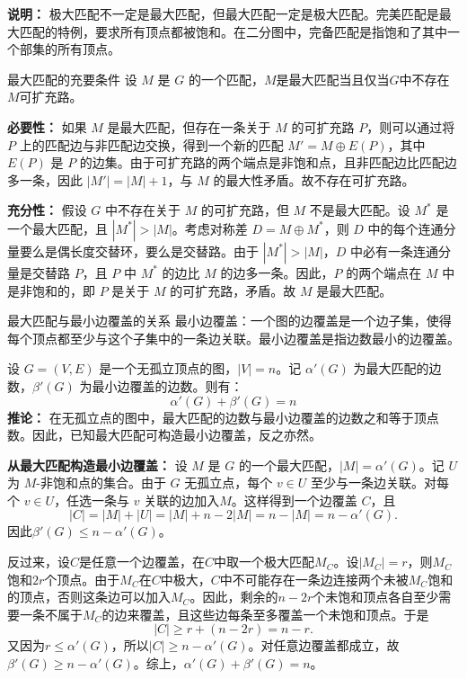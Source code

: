 \documentclass[lang=cn,11pt]{elegantbook}
\begin{document}
\textbf{说明：}
极大匹配不一定是最大匹配，但最大匹配一定是极大匹配。完美匹配是最大匹配的特例，要求所有顶点都被饱和。在二分图中，完备匹配是指饱和了其中一个部集的所有顶点。
\begin{theorem}{最大匹配的充要条件}
    设 $M$ 是 $G$ 的一个匹配，$M$是最大匹配当且仅当$G$中不存在$M$可扩充路。
\end{theorem}
 \textbf{必要性：} 如果 $M$ 是最大匹配，但存在一条关于 $M$ 的可扩充路 $P$，则可以通过将 $P$ 上的匹配边与非匹配边交换，得到一个新的匹配 $M' = M \oplus E(P)$，其中 $E(P)$ 是 $P$ 的边集。由于可扩充路的两个端点是非饱和点，且非匹配边比匹配边多一条，因此 $|M'| = |M| + 1$，与 $M$ 的最大性矛盾。故不存在可扩充路。

\textbf{充分性：} 假设 $G$ 中不存在关于 $M$ 的可扩充路，但 $M$ 不是最大匹配。设 $M^*$ 是一个最大匹配，且 $|M^*| > |M|$。考虑对称差 $D = M \oplus M^*$，则 $D$ 中的每个连通分量要么是偶长度交替环，要么是交替路。由于 $|M^*| > |M|$，$D$ 中必有一条连通分量是交替路 $P$，且 $P$ 中 $M^*$ 的边比 $M$ 的边多一条。因此，$P$ 的两个端点在 $M$ 中是非饱和的，即 $P$ 是关于 $M$ 的可扩充路，矛盾。故 $M$ 是最大匹配。
\begin{theorem}{最大匹配与最小边覆盖的关系}
最小边覆盖：一个图的边覆盖是一个边子集，使得每个顶点都至少与这个子集中的一条边关联。最小边覆盖是指边数最小的边覆盖。

设 $G=(V,E)$ 是一个无孤立顶点的图，$|V|=n$。记 $\alpha'(G)$ 为最大匹配的边数，$\beta'(G)$ 为最小边覆盖的边数。则有：
\[
\alpha'(G) + \beta'(G) = n
\]
\textbf{推论：}
在无孤立点的图中，最大匹配的边数与最小边覆盖的边数之和等于顶点数。因此，已知最大匹配可构造最小边覆盖，反之亦然。
\end{theorem}
\textbf{从最大匹配构造最小边覆盖：}
设 $M$ 是 $G$ 的一个最大匹配，$|M| = \alpha'(G)$。记 $U$ 为 $M$-非饱和点的集合。由于 $G$ 无孤立点，每个 $v \in U$ 至少与一条边关联。对每个 $v \in U$，任选一条与 $v$ 关联的边加入$M$。这样得到一个边覆盖 $C$，且
\[
|C|=|M|+|U|=|M|+n-2|M|=n-|M|=n-\alpha'(G).
\]
因此$\beta'(G)\leqslant n-\alpha'(G)$。

反过来，设$C$是任意一个边覆盖，在$C$中取一个极大匹配$M_C$。设$|M_C|=r$，则$M_C$饱和$2r$个顶点。由于$M_C$在$C$中极大，$C$中不可能存在一条边连接两个未被$M_C$饱和的顶点，否则这条边可以加入$M_C$。因此，剩余的$n-2r$个未饱和顶点各自至少需要一条不属于$M_C$的边来覆盖，且这些边每条至多覆盖一个未饱和顶点。于是
\[
|C|\geqslant r+(n-2r)=n-r.
\]
又因为$r\leqslant \alpha'(G)$，所以$|C|\geqslant n-\alpha'(G)$。对任意边覆盖都成立，故$\beta'(G)\geqslant n-\alpha'(G)$。综上，$\alpha'(G)+\beta'(G)=n$。
\end{document}
